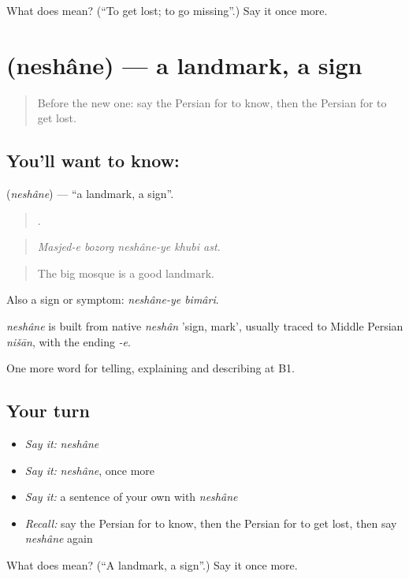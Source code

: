 \begin{tcolorbox}[breakable,colback=teal!4,colframe=teal!35!black,title={Before you move on}]
What does   mean? (\textquotedblleft{}To get lost; to go missing\textquotedblright{}.) Say it once more.
\end{tcolorbox}
\section[\texorpdfstring{\fa{نشانه} (neshâne)}{نشانه (neshâne)}]{ (neshâne) — a landmark, a sign}

\label{lesson:FA-C444-neshane}



\begin{quote}
Before the new one: say the Persian for to know, then the Persian for to get lost.
\end{quote}

\subsection*{You'll want to know: }
\textbf{} (\emph{neshâne}) — \textquotedblleft{}a landmark, a sign\textquotedblright{}.

\begin{quote}
    .
\end{quote}

\begin{quote}
\emph{Masjed-e bozorg neshâne-ye khubi ast.}
\end{quote}

\begin{quote}
The big mosque is a good landmark.
\end{quote}

Also a sign or symptom: \emph{neshâne-ye bimâri}.

\begin{cousinweb}
\emph{neshâne} is built from native \emph{neshân} 'sign, mark', usually traced to Middle Persian \emph{nišān}, with the ending \emph{-e}.
\end{cousinweb}

\begin{grammarlens}[title={What you've built}]
One more word for telling, explaining and describing at B1.
\end{grammarlens}

\subsection*{Your turn}
\begin{itemize}
\raggedright
  \item \emph{Say it:} \emph{neshâne}
  \item \emph{Say it:} \emph{neshâne}, once more
  \item \emph{Say it:} a sentence of your own with \emph{neshâne}
  \item \emph{Recall:} say the Persian for to know, then the Persian for to get lost, then say \emph{neshâne} again
\end{itemize}

\begin{tcolorbox}[breakable,colback=teal!4,colframe=teal!35!black,title={Before you move on}]
What does  mean? (\textquotedblleft{}A landmark, a sign\textquotedblright{}.) Say it once more.
\end{tcolorbox}
